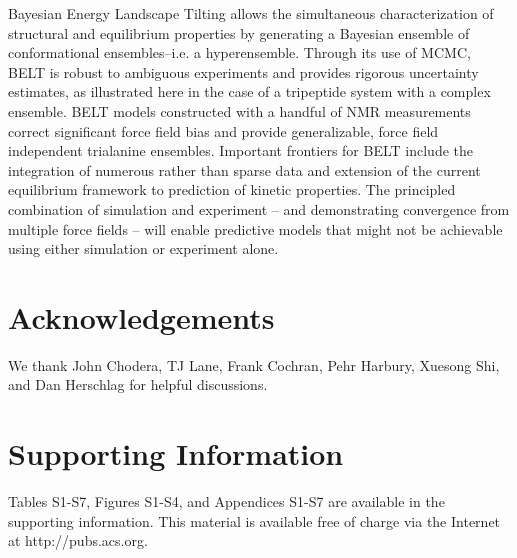 \documentclass[journal=jacsat,manuscript=article]{achemso}
\begin{document}
Bayesian Energy Landscape Tilting allows the simultaneous characterization of structural and equilibrium properties by generating a Bayesian ensemble of conformational ensembles--i.e. a hyperensemble.  Through its use of MCMC, BELT is robust to ambiguous experiments and provides rigorous uncertainty estimates, as illustrated here in the case of a tripeptide system with a complex ensemble.  BELT models constructed with a handful of NMR measurements correct significant force field bias and provide generalizable, force field independent trialanine ensembles. Important frontiers for BELT include the integration of numerous rather than sparse data and extension of the current equilibrium framework to prediction of kinetic properties.  The principled combination of simulation and experiment -- and demonstrating convergence from multiple force fields --  will enable predictive models that might not be achievable using either simulation or experiment alone.  


\section*{Acknowledgements}

We thank John Chodera, TJ Lane, Frank Cochran, Pehr Harbury, Xuesong Shi, and Dan Herschlag for helpful discussions.  

\section*{Supporting Information}

Tables S1-S7, Figures S1-S4, and Appendices S1-S7 are available in the supporting information.  This material is available free of charge via the Internet at http://pubs.acs.org.

\clearpage
\end{document}
